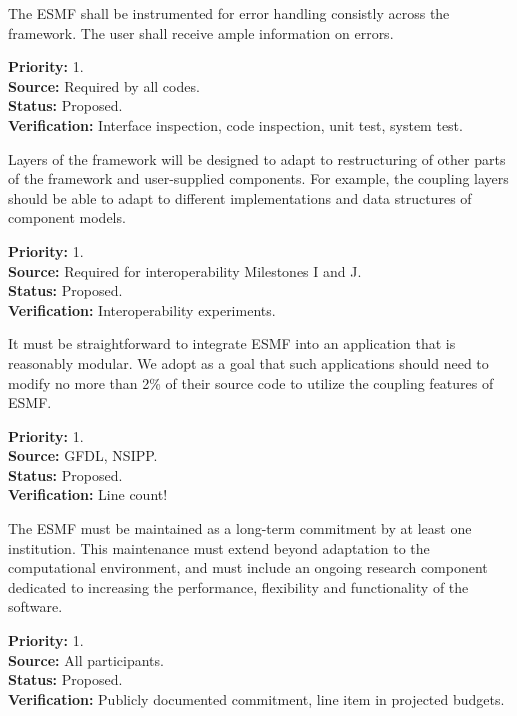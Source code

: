 The ESMF shall be instrumented for error handling consistly across the
framework.  The user shall receive ample information on errors.
\begin{reqlist}
  {\bf Priority:} 1. \\
  {\bf Source:} Required by all codes. \\
  {\bf Status:} Proposed. \\
  {\bf Verification:} Interface inspection, code inspection, unit
  test, system test.
\end{reqlist}

Layers of the framework will be designed to adapt to
restructuring of other parts of the framework and user-supplied components.  
For example, the coupling layers should be able to adapt to different 
implementations and data structures of component models.
\begin{reqlist}
{\bf Priority:} 1. \\
{\bf Source:} Required for interoperability Milestones I and J. \\
{\bf Status:} Proposed. \\
{\bf Verification:} Interoperability experiments.
\end{reqlist}

It must be straightforward to integrate ESMF into an application 
that is reasonably modular.  We adopt as a goal that such applications should
need to modify no more than 2\% of their source code to utilize the coupling
features of ESMF.
\begin{reqlist}
{\bf Priority:} 1. \\
{\bf Source:} GFDL, NSIPP. \\
{\bf Status:} Proposed. \\
{\bf Verification:} Line count!
\end{reqlist}

The ESMF must be maintained as a long-term commitment by at least one
institution.  This maintenance must extend beyond adaptation to the 
computational environment, and must include an ongoing research component
dedicated to increasing the performance, flexibility and functionality of
the software.
\begin{reqlist}
{\bf Priority:} 1. \\
{\bf Source:} All participants. \\
{\bf Status:} Proposed. \\
{\bf Verification:} Publicly documented commitment, line item in 
projected budgets.
\end{reqlist}






